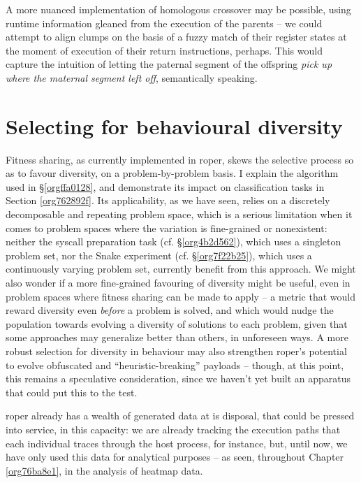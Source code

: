 \documentclass[12pt,glossary]{dalthesis}
\begin{document}
A more nuanced implementation of homologous crossover may be possible, using
runtime information gleaned from the execution of the parents -- we could
attempt to align clumps on the basis of a fuzzy match of their register states
at the moment of execution of their return instructions, perhaps. This would
capture the intuition of letting the paternal segment of the offspring \emph{pick up
where the maternal segment left off}, semantically speaking.


\section{Selecting for behavioural diversity}
\label{sec:org3778ef3}
\label{orgd692af8}

Fitness sharing, as currently implemented in \gls{roper}, skews the selective process
so as to favour diversity, on a problem-by-problem basis. I explain the algorithm
used in \S \ref{orgffa0128}, and demonstrate its impact on classification tasks in 
Section \ref{org762892f}. Its applicability, as we have seen, relies
on a discretely decomposable and repeating problem space, which is a serious limitation
when it comes to problem spaces where the variation is fine-grained or nonexistent:
neither the syscall preparation task (cf. \S \ref{org4b2d562}), which uses a
singleton problem set, nor the
Snake experiment (cf. \S \ref{org7f22b25}), which uses a continuously
varying problem set, currently benefit from this approach. We might also wonder if
a more fine-grained favouring of diversity might be useful, even in problem spaces
where fitness sharing can be made to apply -- a metric that would reward diversity
even \emph{before} a problem is solved, and which would nudge the population towards
evolving a diversity of solutions to each problem, given that some approaches may
generalize better than others, in unforeseen ways. A more robust selection for
diversity in behaviour may also strengthen \gls{roper}'s potential to evolve 
obfuscated and ``heuristic-breaking'' payloads -- though, at this point, this remains
a speculative consideration, since we haven't yet built an apparatus that could
put this to the test. 

\Gls{roper} already has a wealth of generated data at is disposal, that could be
pressed into service, in this capacity: we are already tracking the execution
paths that each individual traces through the host process, for instance, but,
until now, we have only used this data for analytical purposes -- as seen,
throughout Chapter \ref{org76ba8e1}, in the analysis of heatmap data. 
\end{document}
